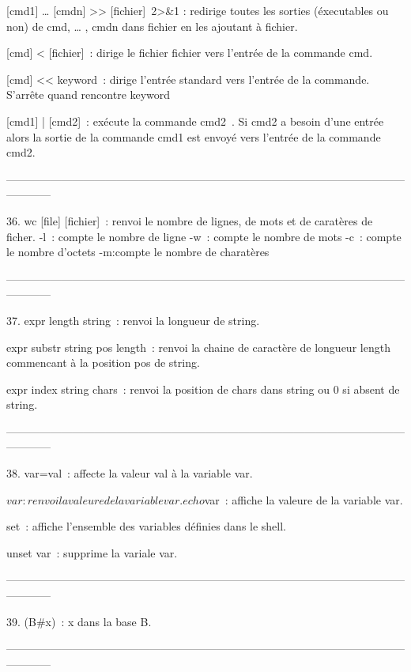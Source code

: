 \documentclass[a4paper, 10pt, onecolumn, openright, oneside]{book}
\begin{document}
[cmd1] … [cmdn] >> [fichier] 2>&1 : redirige toutes les sorties (éxecutables ou non) de cmd, … , cmdn dans fichier en les ajoutant à fichier.

[cmd] < [fichier] : dirige le fichier fichier vers l'entrée de la commande cmd.

[cmd] <<  keyword : dirige l’entrée standard vers l’entrée de la commande. S’arrête quand rencontre keyword

[cmd1] | [cmd2] : exécute la commande cmd2 . Si cmd2 a besoin d'une entrée alors la sortie de la commande cmd1 est envoyé vers l'entrée de la commande cmd2.

------------------------------------------------------------------------------------------------------------------------

    36. wc [file] [fichier] : renvoi le nombre de lignes, de mots et de caratères de ficher.
       -l : compte le nombre de ligne
       -w : compte le nombre de mots
       -c : compte le nombre d’octets
       -m:compte le nombre de charatères

------------------------------------------------------------------------------------------------------------------------

    37. expr length string : renvoi la longueur de string.

expr substr string pos length : renvoi la chaine de caractère de longueur length commencant à la position pos de string.

expr index string chars : renvoi la position de chars dans string ou 0 si absent de string.

------------------------------------------------------------------------------------------------------------------------

    38. var=val : affecte la valeur val à la variable var.

$var : renvoi la valeure de la variable var.

echo $var : affiche la valeure de la variable var.

set : affiche l’ensemble des variables définies dans le shell.

unset var : supprime la variale var.

------------------------------------------------------------------------------------------------------------------------

    39. (B#x) : x dans la base B.

------------------------------------------------------------------------------------------------------------------------
\end{document}
